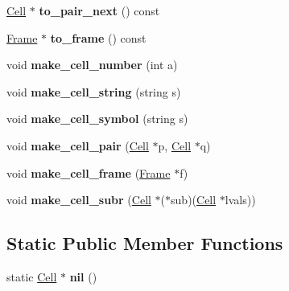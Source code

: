 \begin{DoxyCompactItemize}
\item 
\hypertarget{classCell_ae4b69fad453eabfef135575dfff784dc}{\hyperlink{classCell}{Cell} $\ast$ {\bfseries to\-\_\-pair\-\_\-next} () const }\label{classCell_ae4b69fad453eabfef135575dfff784dc}

\item 
\hypertarget{classCell_a5d07f221a15e84b35abe57071ea46cab}{\hyperlink{classFrame}{Frame} $\ast$ {\bfseries to\-\_\-frame} () const }\label{classCell_a5d07f221a15e84b35abe57071ea46cab}

\item 
\hypertarget{classCell_abb258fb7c184260fef5961f814bceb7f}{void {\bfseries make\-\_\-cell\-\_\-number} (int a)}\label{classCell_abb258fb7c184260fef5961f814bceb7f}

\item 
\hypertarget{classCell_ab0e4f4d88666cadc7d21a0cd3971efee}{void {\bfseries make\-\_\-cell\-\_\-string} (string s)}\label{classCell_ab0e4f4d88666cadc7d21a0cd3971efee}

\item 
\hypertarget{classCell_a56f50d1f105b2e8f087870f27d80e693}{void {\bfseries make\-\_\-cell\-\_\-symbol} (string s)}\label{classCell_a56f50d1f105b2e8f087870f27d80e693}

\item 
\hypertarget{classCell_a3ed1852893b5cdd81faa73e832451adf}{void {\bfseries make\-\_\-cell\-\_\-pair} (\hyperlink{classCell}{Cell} $\ast$p, \hyperlink{classCell}{Cell} $\ast$q)}\label{classCell_a3ed1852893b5cdd81faa73e832451adf}

\item 
\hypertarget{classCell_a437be131a0192328669af7539be7acb7}{void {\bfseries make\-\_\-cell\-\_\-frame} (\hyperlink{classFrame}{Frame} $\ast$f)}\label{classCell_a437be131a0192328669af7539be7acb7}

\item 
\hypertarget{classCell_a500fdba838de252002c7200ed863807c}{void {\bfseries make\-\_\-cell\-\_\-subr} (\hyperlink{classCell}{Cell} $\ast$($\ast$sub)(\hyperlink{classCell}{Cell} $\ast$lvals))}\label{classCell_a500fdba838de252002c7200ed863807c}

\end{DoxyCompactItemize}
\subsection*{Static Public Member Functions}
\begin{DoxyCompactItemize}
\item 
\hypertarget{classCell_aaddcdd9cbc00527042f0a67b07cf20e1}{static \hyperlink{classCell}{Cell} $\ast$ {\bfseries nil} ()}\label{classCell_aaddcdd9cbc00527042f0a67b07cf20e1}

\end{DoxyCompactItemize}
